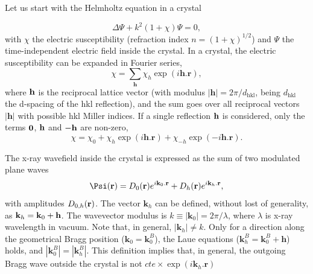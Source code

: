 \documentclass[preprint]{iucr}              %
\newcommand{\inred}[1]{{\color{red}#1}}
\begin{document}
Let us start with the Helmholtz equation in a crystal

\begin{equation}
\label{eq:helmholz}
    \Delta \Psi + k^2 (1+\chi) \Psi = 0,
\end{equation}
with $\chi$ the electric susceptibility (refraction index $n=(1+\chi)^{1/2}$) and $\Psi$ the time-independent electric field inside the crystal. In a crystal, the electric susceptibility can be expanded in Fourier series,
\begin{equation}
\label{eq:chi}
    \chi = \sum_{\textbf{h}} \chi_h \exp(i \textbf{h} . \textbf{r}),
\end{equation}
where $\bf{h}$ is the reciprocal lattice vector (with modulus $|\textbf{h}|=2\pi/d_\text{hkl}$, being $d_\text{hkl}$ the d-spacing of the hkl reflection), and the sum goes over all reciprocal vectors $|\textbf{h}|$ with possible hkl Miller indices. If a single reflection $\bf{h}$ is considered, only the terms $\bf{0}$, $\bf{h}$ and $\bf{-h}$ are non-zero, 
\begin{equation}
\label{eq:chisimple}
    \chi = \chi_0 + \chi_{h} \exp(i \textbf{h} . \textbf{r}) + \chi_{-h} \exp(-i \textbf{h} . \textbf{r}).
\end{equation}

The x-ray wavefield inside the crystal is expressed as the sum of two modulated plane waves
\begin{equation}
\label{eq:wavefield}
    \Psi(\textbf r) = D_0(\textbf r) e^{i \textbf k_0 . \textbf r} + D_h(\textbf r) e^{i \textbf k_h . \textbf r},
\end{equation}
with amplitudes $D_{0,h}(\textbf r)$.
The vector $\textbf{k}_h$ can be defined, without lost of generality, as $\textbf k_h=\textbf k_0 + \textbf h$. 
The wavevector modulus is $k \equiv |\textbf{k}_0|=2\pi/\lambda$, where $\lambda$ is x-ray wavelength in vacuum. Note that, in general, $ |\textbf{k}_h| \ne k$. Only for a direction along the geometrical Bragg position ($\textbf{k}_0=\textbf{k}_0^B$), the Laue equations ($\textbf{k}_h^B=\textbf{k}_0^B+\textbf{h}$) holds, and $|\textbf{k}_0^B|=|\textbf{k}_h^B|$. \inred{This definition implies that, in general, the outgoing Bragg wave outside the crystal is not $cte \times \exp(i \textbf{k}_h . \textbf{r})$}
\end{document}
